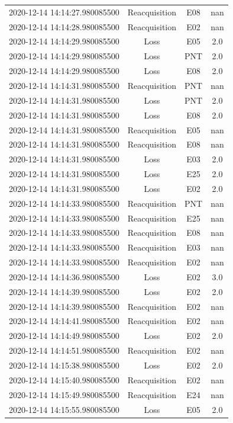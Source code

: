 \begin{enumerate}
\begin{longtabu}{cccc}
2020{-}12{-}14 14:14:27.980085500&Reacquisition&E08&nan\\%
2020{-}12{-}14 14:14:28.980085500&Reacquisition&E02&nan\\%
2020{-}12{-}14 14:14:29.980085500&Loss&E05&2.0\\%
2020{-}12{-}14 14:14:29.980085500&Loss&PNT&2.0\\%
2020{-}12{-}14 14:14:29.980085500&Loss&E08&2.0\\%
2020{-}12{-}14 14:14:31.980085500&Reacquisition&PNT&nan\\%
2020{-}12{-}14 14:14:31.980085500&Loss&PNT&2.0\\%
2020{-}12{-}14 14:14:31.980085500&Loss&E08&2.0\\%
2020{-}12{-}14 14:14:31.980085500&Reacquisition&E05&nan\\%
2020{-}12{-}14 14:14:31.980085500&Reacquisition&E08&nan\\%
2020{-}12{-}14 14:14:31.980085500&Loss&E03&2.0\\%
2020{-}12{-}14 14:14:31.980085500&Loss&E25&2.0\\%
2020{-}12{-}14 14:14:31.980085500&Loss&E02&2.0\\%
2020{-}12{-}14 14:14:33.980085500&Reacquisition&PNT&nan\\%
2020{-}12{-}14 14:14:33.980085500&Reacquisition&E25&nan\\%
2020{-}12{-}14 14:14:33.980085500&Reacquisition&E08&nan\\%
2020{-}12{-}14 14:14:33.980085500&Reacquisition&E03&nan\\%
2020{-}12{-}14 14:14:33.980085500&Reacquisition&E02&nan\\%
2020{-}12{-}14 14:14:36.980085500&Loss&E02&3.0\\%
2020{-}12{-}14 14:14:39.980085500&Loss&E02&2.0\\%
2020{-}12{-}14 14:14:39.980085500&Reacquisition&E02&nan\\%
2020{-}12{-}14 14:14:41.980085500&Reacquisition&E02&nan\\%
2020{-}12{-}14 14:14:49.980085500&Loss&E02&2.0\\%
2020{-}12{-}14 14:14:51.980085500&Reacquisition&E02&nan\\%
2020{-}12{-}14 14:15:38.980085500&Loss&E02&2.0\\%
2020{-}12{-}14 14:15:40.980085500&Reacquisition&E02&nan\\%
2020{-}12{-}14 14:15:49.980085500&Reacquisition&E24&nan\\%
2020{-}12{-}14 14:15:55.980085500&Loss&E05&2.0\\%

\end{longtabu}
\end{enumerate}
